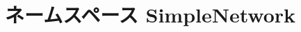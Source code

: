 \hypertarget{namespaceSimpleNetwork}{
\section{ネームスペース SimpleNetwork}
\label{namespaceSimpleNetwork}
}
